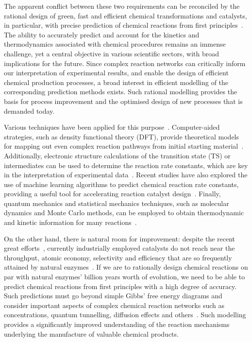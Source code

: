 The apparent conflict between these two requirements can be reconciled by
the rational design of green,
fast and efficient chemical transformations and catalysts,
in particular,
with precise prediction of chemical reactions from first principles~\cite{Kitchin_2012}.
The ability to accurately predict and account for the kinetics and thermodynamics associated
with chemical procedures remains an immense challenge,
yet a central objective in various scientific sectors,
with broad implications for the future.
Since complex reaction networks can critically inform our interpretation of experimental results,
and enable the design of efficient chemical production processes,
a broad interest in efficient modelling of the corresponding prediction methods exists.
Such rational modelling provides the basis for process improvement and the optimised design of new processes
that is demanded today.

Various techniques have been applied for this purpose~\cite{Houk_2014,Chew_2020,Chin_2022,Cao2022}.
Computer-aided strategies,
such as density functional theory (DFT),
provide theoretical models for mapping out even complex reaction pathways from initial starting material~\cite{Maeda_2011,Simm_2017,Rappoport_2019}.
Additionally,
electronic structure calculations of the transition state (TS) or intermediates can be used to determine the reaction rate constants,
which are key in the interpretation of experimental data~\cite{Plata_2015,Santoro_2016,Coelho_2019,Oliveira_2020}.
Recent studies have also explored the use of machine learning algorithms
to predict chemical reaction rate constants,
providing a useful tool for
accelerating reaction catalyst design~\cite{Komp_2022,Tu_2022}.
Finally,
quantum mechanics and statistical mechanics techniques,
such as molecular dynamics and Monte Carlo methods,
can be employed to obtain thermodynamic and kinetic information for many reactions~\cite{Wang_2014}.

On the other hand, there is natural room for improvement:
despite the recent great efforts~\cite{Peng_2016},
currently industrially employed catalysts do
not reach near the throughput,
atomic economy,
selectivity and efficiency that
are so frequently attained by natural
enzymes~\cite{Catalysis_in_Chemistry_and_Enzymology}.
If we are to rationally design chemical reactions on par with natural enzymes' billion years worth of evolution,
we need to be able to predict chemical reactions from first principles with a
high degree of accuracy.
Such predictions must go beyond simple Gibbs' free energy
diagrams and consider important aspects of complex chemical reaction networks
such as concentrations,
quantum tunnelling,
diffusion effects and others~\cite{Besora_2018}.
Such modelling provides a significantly improved understanding of the reaction mechanisms underlying the manufacture of valuable chemical products.

